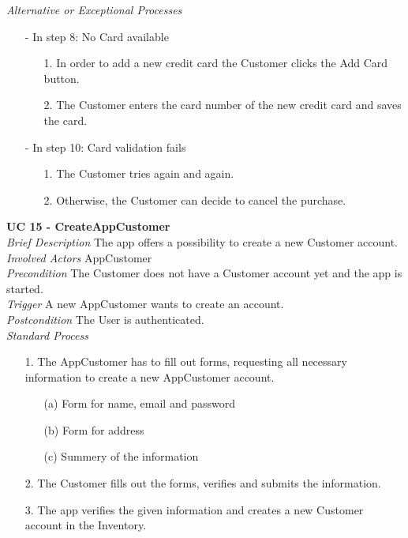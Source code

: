 \textit{Alternative or Exceptional Processes}
\begin{itemize}
	\item[-] In step 8: No Card available
	\begin{itemize}
		\item[1.] In order to add a new credit card the Customer clicks the Add Card button.
		\item[2.] The Customer enters the card number of the new credit card and saves the card.
	\end{itemize}
	
	\item[-] In step 10: Card validation fails
	\begin{itemize}
		\item[1.] The Customer tries again and again.
		\item[2.] Otherwise, the Customer can decide to cancel the purchase.
	\end{itemize}
\end{itemize}


\textbf{UC 15 - CreateAppCustomer}\\ \newline
\textit{Brief Description} The app offers a possibility to create a new Customer account.\\ \newline
\textit{Involved Actors} AppCustomer\\ \newline
\textit{Precondition} The Customer does not have a Customer account yet and the app is started.\\ \newline
\textit{Trigger} A new AppCustomer wants to create an account.\\ \newline
\textit{Postcondition} The User is authenticated.\\ \newline
\textit{Standard Process}
\begin{itemize}[leftmargin=*]
	\item[1.] The AppCustomer has to fill out forms, requesting all necessary information to create a new AppCustomer account.
	\begin{itemize}
		\item[(a)] Form for name, email and password
		\item[(b)] Form for address
		\item[(c)] Summery of the information 
	\end{itemize}
	\item[2.]The Customer fills out the forms, verifies and submits the information.
	\item[3.] The app verifies the given information and creates a new Customer account in the Inventory.
\end{itemize}

